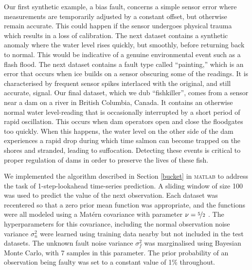 \documentclass{article} %
\begin{document}
Our first synthetic example, a bias fault, concerns a simple sensor
error where measurements are temporarily adjusted by a constant
offset, but otherwise remain accurate. This could happen if the sensor
undergoes physical trauma which results in a loss of calibration.
The next dataset contains a synthetic anomaly where the water level
rises quickly, but smoothly, before returning back to normal. This
would be indicative of a genuine environmental event such as a flash
flood.
The next dataset contains a fault type called ``painting,'' which is
an error that occurs when ice builds on a sensor obscuring some of the
readings. It is characterised by frequent sensor spikes interlaced
with the original, and still accurate, signal.
Our final dataset, which we dub ``fishkiller'', comes from a sensor
near a dam on a river in British Columbia, Canada. It contains an
otherwise normal water level-reading that is occasionally interrupted
by a short period of rapid oscillation. This occurs when dam operators
open and close the floodgates too quickly. When this happens, the
water level on the other side of the dam experiences a rapid drop
during which time salmon can become trapped on the shores and
stranded, leading to suffocation. Detecting these events is critical
to proper regulation of dams in order to preserve the lives of these
fish.


We implemented the algorithm described in Section \ref{bucket} in
\textsc{matlab} to address the task of 1-step-lookahead time-series
prediction.  A sliding window of size 100 was used to predict the
value of the next observation.  Each dataset was recentered so that a
zero prior mean function was appropriate, and the functions were all
modeled using a Mat\'{e}rn covariance with parameter $\nu =
\nicefrac{5}{2}$ \citep{gpml}.  The hyperparameters for this
covariance, including the normal observation noise variance
$\sigma_n^2$ were learned using training data nearby but not included
in the test datasets.  The unknown fault noise variance $\sigma_f^2$
was marginalised using Bayesian Monte Carlo, with 7 samples in this
parameter.  The prior probability of an observation being faulty was
set to a constant value of 1\% throughout.
\end{document}
